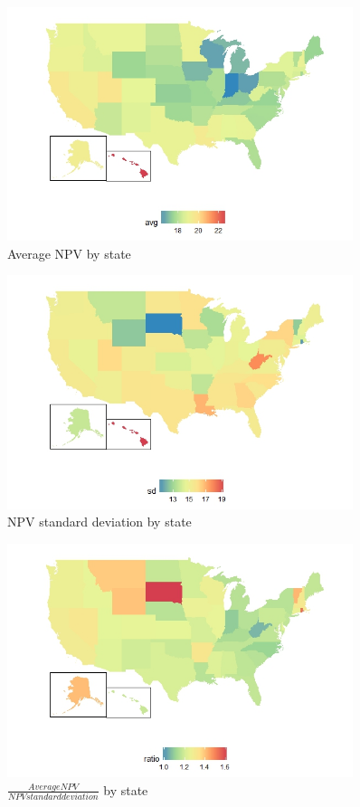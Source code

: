 \documentclass[12 pt]{uncw_thesis}
\theoremstyle{plain}
\theoremstyle{remark}
\theoremstyle{definition}
\begin{document}
\begin{figure}
	\includegraphics[width=0.9\textwidth]{images/MapAvg.jpeg}
	\caption{Average NPV by state}
	\label{fig:MapAvg}
\end{figure}
\begin{figure}
	\includegraphics[width=0.9\textwidth]{images/MapSD.jpeg}
	\caption{NPV standard deviation by state}
	\label{fig:MapSD}
\end{figure}
\begin{figure}
	\includegraphics[width=0.9\textwidth]{images/MapSR.jpeg}
	\caption{$\frac{Average NPV}{NPV standard deviation}$ by state}
	\label{fig:MapRatio}
\end{figure}
\end{document}
